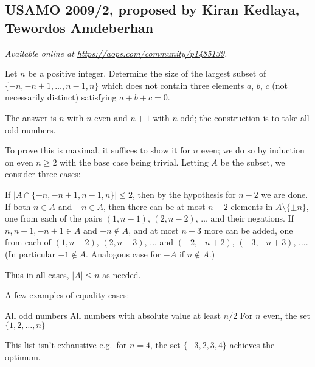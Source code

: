 \documentclass[11pt]{scrartcl}
\begin{document}
\subsection{USAMO 2009/2, proposed by Kiran Kedlaya, Tewordos Amdeberhan}
\textsl{Available online at \url{https://aops.com/community/p1485139}.}
\begin{mdframed}[style=mdpurplebox,frametitle={Problem statement}]
Let $n$ be a positive integer.
Determine the size of the largest subset of $\{ -n, -n+1, \dots, n-1, n\}$
which does not contain three elements $a$, $b$, $c$ (not necessarily distinct)
satisfying $a+b+c=0$.
\end{mdframed}
The answer is $n$ with $n$ even and $n+1$ with $n$ odd;
the construction is to take all odd numbers.

To prove this is maximal, it suffices to show it for $n$ even;
we do so by induction on even $n \ge 2$ with the base case being trivial.
Letting $A$ be the subset, we consider three cases:
\begin{enumerate}[(i)]
  \ii If $|A \cap \{-n,-n+1,n-1,n\}| \le 2$,
  then by the hypothesis for $n-2$ we are done.
  \ii If both $n \in A$ and $-n \in A$,
  then there can be at most $n-2$ elements in $A \setminus \{\pm n\}$,
  one from each of the pairs $(1,n-1)$, $(2,n-2)$, $\dots$
  and their negations.
  \ii If $n, n-1, -n+1 \in A$ and $-n \notin A$,
  and at most $n-3$ more can be added,
  one from each of $(1, n-2)$, $(2, n-3)$, $\dots$
  and $(-2, -n+2)$, $(-3, -n+3)$, $\dots$.
  (In particular $-1 \notin A$.
  Analogous case for $-A$ if $n \notin A$.)
\end{enumerate}
Thus in all cases, $|A| \le n$ as needed.

\begin{remark*}
  A few examples of equality cases:
  \begin{itemize}
    \ii All odd numbers
    \ii All numbers with absolute value at least $n/2$
    \ii For $n$ even, the set $\{1, 2, \dots, n\}$
  \end{itemize}
  This list isn't exhaustive
  e.g.\ for $n=4$, the set $\{-3,2,3,4\}$ achieves the optimum.
\end{remark*}
\pagebreak
\end{document}
